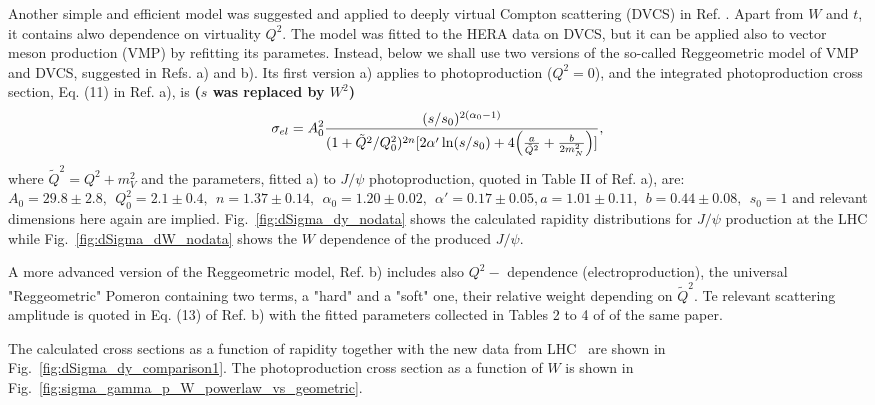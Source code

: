\documentclass[12pt]{article}
\begin{document}
Another simple and efficient model was suggested and applied to deeply virtual Compton scattering (DVCS) in Ref. \cite{Capua}. Apart from $W$ and $t$, it contains alwo dependence on virtuality $Q^2$.
The model was fitted to the HERA data on DVCS, but it can be applied also to vector meson production (VMP) by refitting its parametes.
Instead, below we shall use two versions of the so-called Reggeometric model of VMP and DVCS, suggested in Refs. \cite{Fazio}a) and \cite{Fazio}b).
Its first version \cite{Fazio} a) applies to photoproduction ($Q^2=0$), and the integrated photoproduction cross section, Eq. (11) in Ref. \cite{Fazio}a), is {\bf($s$ was replaced by $W^2$)}
\begin{equation}
\sigma_{el}=A_0^2\frac{(s/s_0)^{2(\alpha_0-1)}}{(1+\tilde Q^2/Q^2_0)^{2n}[2\alpha'\ln(s/s_0)+4\Bigl(\frac{a}{\tilde Q^2}+\frac{b}{2m_N^2}\Bigr)]},
\end{equation}
where $\tilde Q^2=Q^2+m_V^2$ and the parameters, fitted \cite{Fazio}a) to $J/\psi$ photoproduction, quoted in
Table II of Ref. \cite{Fazio}a), are: $A_0=29.8\pm 2.8,\ \ Q_0^2=2.1\pm 0.4,\ \ 
n=1.37\pm 0.14,\ \ \alpha_0 =1.20\pm 0.02,\ \ \alpha'=0.17\pm 0.05, a=1.01\pm 0.11,\ \ b=0.44\pm 0.08,\ \ s_0=1$ and relevant dimensions here again are implied.
Fig.~\ref{fig:dSigma_dy_nodata} shows the calculated rapidity distributions for $J/\psi$ production at the LHC while Fig.~\ref{fig:dSigma_dW_nodata} shows the $W$ dependence of the produced $J/\psi$.

A more advanced version of the Reggeometric model, Ref. \cite{Fazio}b) includes also $Q^2-$ dependence (electroproduction), the universal "Reggeometric" Pomeron containing two terms, a "hard" and a "soft" one, their relative weight depending on $\tilde Q^2$. Te relevant scattering amplitude is quoted in Eq. (13) of Ref. \cite{Fazio}b) with the fitted parameters collected in Tables 2 to 4 of of the same paper.

The calculated cross sections as a function of rapidity together with the new data from LHC~\cite{LHCb1, LHCb2} are shown in Fig.~\ref{fig:dSigma_dy_comparison1}.
The photoproduction cross section as a function of $W$ is shown in Fig.~\ref{fig:sigma_gamma_p_W_powerlaw_vs_geometric}.
\end{document}
